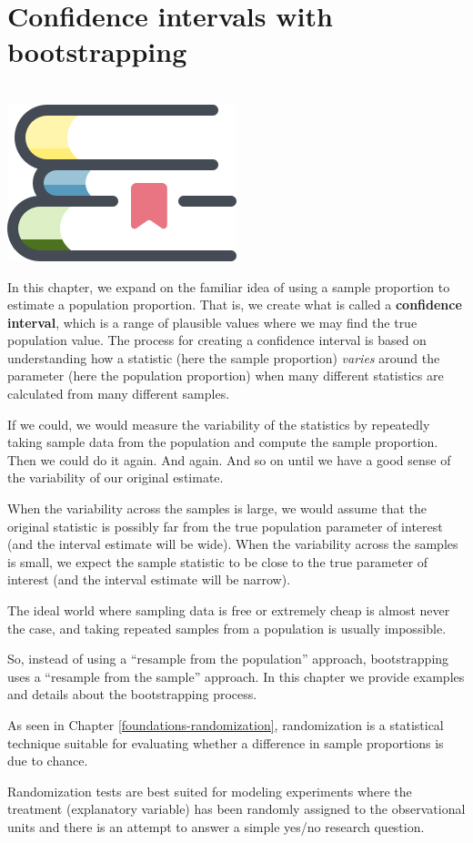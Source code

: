 \documentclass[
  10pt,
  openany]{book}
\newenvironment{mdframedwithfootChapterintro}
{   
    \savenotes
    \begin{mdframed}[%
    topline=true, bottomline=true, linecolor=oiB, linewidth=1.4pt,
    rightline=false, leftline=false,
    backgroundcolor=oiLB]
    \renewcommand{\thempfootnote}{\arabic{footnote}}
    }
{
    \end{mdframed}
    \spewnotes
}
\newenvironment{chapterintro}{
\vspace{4mm}
\begin{mdframedwithfootChapterintro}
\begin{minipage}[t]{0.10\textwidth}
{$\:$ \\ \setkeys{Gin}{width=2.5em,keepaspectratio}\includegraphics{images/_icons/chapterintro.png}}
\end{minipage}
\hfill
\begin{minipage}[t]{0.90\textwidth}
\setlength{\parskip}{1em}
\large
}{\end{minipage}
\end{mdframedwithfootChapterintro}
\vspace{4mm}
}
\begin{document}
\hypertarget{foundations-bootstrapping}{%
\chapter{Confidence intervals with bootstrapping}\label{foundations-bootstrapping}}

\begin{chapterintro}
In this chapter, we expand on the familiar idea of using a sample proportion to estimate a population proportion.
That is, we create what is called a \textbf{confidence interval}, which is a range of plausible values where we may find the true population value.
The process for creating a confidence interval is based on understanding how a statistic (here the sample proportion) \emph{varies} around the parameter (here the population proportion) when many different statistics are calculated from many different samples.

If we could, we would measure the variability of the statistics by repeatedly taking sample data from the population and compute the sample proportion.
Then we could do it again.
And again.
And so on until we have a good sense of the variability of our original estimate.

When the variability across the samples is large, we would assume that the original statistic is possibly far from the true population parameter of interest (and the interval estimate will be wide).
When the variability across the samples is small, we expect the sample statistic to be close to the true parameter of interest (and the interval estimate will be narrow).

The ideal world where sampling data is free or extremely cheap is almost never the case, and taking repeated samples from a population is usually impossible.

So, instead of using a ``resample from the population'' approach, bootstrapping uses a ``resample from the sample'' approach.
In this chapter we provide examples and details about the bootstrapping process.

\end{chapterintro}

As seen in Chapter \ref{foundations-randomization}, randomization is a statistical technique suitable for evaluating whether a difference in sample proportions is due to chance.

Randomization tests are best suited for modeling experiments where the treatment (explanatory variable) has been randomly assigned to the observational units and there is an attempt to answer a simple yes/no research question.
\end{document}

